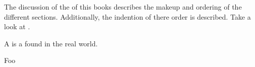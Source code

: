 \documentclass[crop=false,class=scrbook]{standalone}
\begin{document}
The discussion of the  of this books describes the makeup and ordering
of the different sections.
Additionally, the indention of there order is described.
Take a look at .

\begin{defn}[\g{pnt}]
	A  is a  found in the real world.
\end{defn}

\begin{algorithm}
\begin{algorithmic}
	\State Foo
\end{algorithmic}
\end{algorithm}
\end{document}
